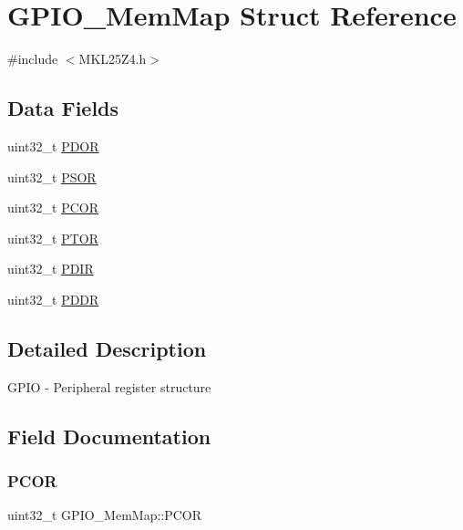 \hypertarget{struct_g_p_i_o___mem_map}{}\section{G\+P\+I\+O\+\_\+\+Mem\+Map Struct Reference}
\label{struct_g_p_i_o___mem_map}


{\ttfamily \#include $<$M\+K\+L25\+Z4.\+h$>$}

\subsection*{Data Fields}
\begin{DoxyCompactItemize}
\item 
uint32\+\_\+t \hyperlink{struct_g_p_i_o___mem_map_aaf4f486952b9b4680e270ce6266122fd}{P\+D\+OR}
\item 
uint32\+\_\+t \hyperlink{struct_g_p_i_o___mem_map_a14833f065ec123137ccce5ab873b5879}{P\+S\+OR}
\item 
uint32\+\_\+t \hyperlink{struct_g_p_i_o___mem_map_a996f6a159415a5c0d0683346e950e7fb}{P\+C\+OR}
\item 
uint32\+\_\+t \hyperlink{struct_g_p_i_o___mem_map_a03faa882b5f4554ff4c11954c2d8759b}{P\+T\+OR}
\item 
uint32\+\_\+t \hyperlink{struct_g_p_i_o___mem_map_a01933bea5d005bf126ea2e0345518763}{P\+D\+IR}
\item 
uint32\+\_\+t \hyperlink{struct_g_p_i_o___mem_map_a49dfaa95d08fa9178dd7f098c87f562d}{P\+D\+DR}
\end{DoxyCompactItemize}


\subsection{Detailed Description}
G\+P\+IO -\/ Peripheral register structure 

\subsection{Field Documentation}
\mbox{\label{struct_g_p_i_o___mem_map_a996f6a159415a5c0d0683346e950e7fb}} 
\subsubsection{\texorpdfstring{P\+C\+OR}{PCOR}}
{\footnotesize\ttfamily uint32\+\_\+t G\+P\+I\+O\+\_\+\+Mem\+Map\+::\+P\+C\+OR}

